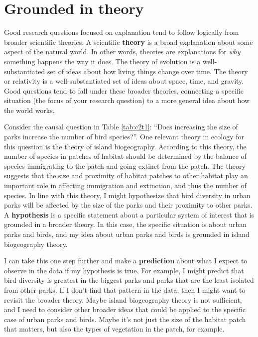 \documentclass[
]{book}
\begin{document}
\section{Grounded in theory}\label{grounded-in-theory}

Good research questions focused on explanation tend to follow logically from broader scientific theories. A scientific \textbf{theory} is a broad explanation about some aspect of the natural world. In other words, theories are explanations for \emph{why} something happens the way it does. The theory of evolution is a well-substantiated set of ideas about how living things change over time. The theory or relativity is a well-substantiated set of ideas about space, time, and gravity. Good questions tend to fall under these broader theories, connecting a specific situation (the focus of your research question) to a more general idea about how the world works.

Consider the causal question in Table \ref{tab:c2t1}: ``Does increasing the size of parks increase the number of bird species?''. One relevant theory in ecology for this question is the theory of island biogeography. According to this theory, the number of species in patches of habitat should be determined by the balance of species immigrating to the patch and going extinct from the patch. The theory suggests that the size and proximity of habitat patches to other habitat play an important role in affecting immigration and extinction, and thus the number of species. In line with this theory, I might hypothesize that bird diversity in urban parks will be affected by the size of the parks and their proximity to other parks. A \textbf{hypothesis} is a specific statement about a particular system of interest that is grounded in a broader theory. In this case, the specific situation is about urban parks and birds, and my idea about urban parks and birds is grounded in island biogeography theory.

I can take this one step further and make a \textbf{prediction} about what I expect to observe in the data if my hypothesis is true. For example, I might predict that bird diversity is greatest in the biggest parks and parks that are the least isolated from other parks. If I don't find that pattern in the data, then I might want to revisit the broader theory. Maybe island biogeography theory is not sufficient, and I need to consider other broader ideas that could be applied to the specific case of urban parks and birds. Maybe it's not just the size of the habitat patch that matters, but also the types of vegetation in the patch, for example.
\end{document}

